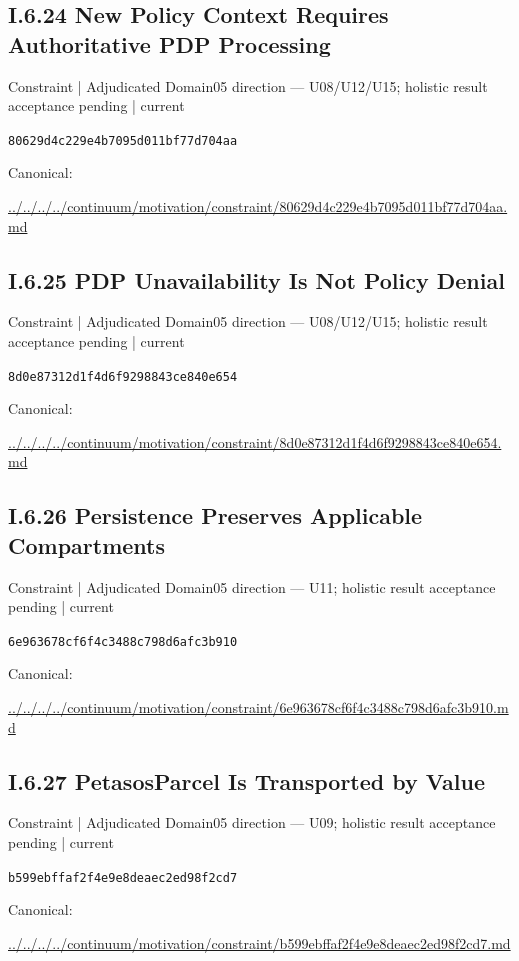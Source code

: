 \documentclass[10pt,a4paper]{article}
\begin{document}
\subsection*{I.6.24 New Policy Context Requires Authoritative PDP Processing}
{\small Constraint | Adjudicated Domain05 direction — U08/U12/U15; holistic result acceptance pending | current}\par
\texttt{80629d4c229e4b7095d011bf77d704aa}\par
Canonical: \par
{\footnotesize\url{../../../../continuum/motivation/constraint/80629d4c229e4b7095d011bf77d704aa.md}}\par
\subsection*{I.6.25 PDP Unavailability Is Not Policy Denial}
{\small Constraint | Adjudicated Domain05 direction — U08/U12/U15; holistic result acceptance pending | current}\par
\texttt{8d0e87312d1f4d6f9298843ce840e654}\par
Canonical: \par
{\footnotesize\url{../../../../continuum/motivation/constraint/8d0e87312d1f4d6f9298843ce840e654.md}}\par
\subsection*{I.6.26 Persistence Preserves Applicable Compartments}
{\small Constraint | Adjudicated Domain05 direction — U11; holistic result acceptance pending | current}\par
\texttt{6e963678cf6f4c3488c798d6afc3b910}\par
Canonical: \par
{\footnotesize\url{../../../../continuum/motivation/constraint/6e963678cf6f4c3488c798d6afc3b910.md}}\par
\subsection*{I.6.27 PetasosParcel Is Transported by Value}
{\small Constraint | Adjudicated Domain05 direction — U09; holistic result acceptance pending | current}\par
\texttt{b599ebffaf2f4e9e8deaec2ed98f2cd7}\par
Canonical: \par
{\footnotesize\url{../../../../continuum/motivation/constraint/b599ebffaf2f4e9e8deaec2ed98f2cd7.md}}\par
\end{document}
